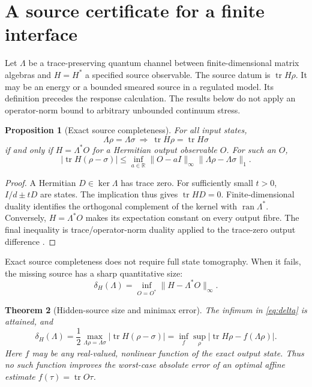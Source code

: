 \documentclass[12pt,a4paper]{article}
\newtheorem{theorem}{Theorem}[section]
\newtheorem{proposition}[theorem]{Proposition}
\theoremstyle{definition}
\newcommand{\tr}{\operatorname{tr}}
\newcommand{\ran}{\operatorname{ran}}
\begin{document}
\section{A source certificate for a finite interface}
\label{sec:source}

Let $\Lambda$ be a trace-preserving quantum channel between
finite-dimensional matrix algebras and $H=H^*$ a specified source
observable. The source datum is $\tr H\rho$. It may be an energy or a
bounded smeared source in a regulated model. Its definition precedes the
response calculation. The results below do not apply an operator-norm
bound to arbitrary unbounded continuum stress.

\begin{proposition}[Exact source completeness]
\label{prop:source-complete}
For all input states,
\begin{equation}
 \Lambda\rho=\Lambda\sigma\ \Longrightarrow\
 \tr H\rho=\tr H\sigma
\end{equation}
if and only if $H=\Lambda^*O$ for a Hermitian output observable $O$.
For such an $O$,
\begin{equation}
 |\tr H(\rho-\sigma)|
 \leq\inf_{a\in\mathbb R}\|O-aI\|_\infty
                  \|\Lambda\rho-\Lambda\sigma\|_1.
 \label{eq:source-stability}
\end{equation}
\end{proposition}
\begin{proof}
A Hermitian $D\in\ker\Lambda$ has trace zero. For sufficiently small
$t>0$, $I/d\pm tD$ are states. The implication thus gives $\tr HD=0$.
Finite-dimensional duality identifies the orthogonal complement of the
kernel with $\ran\Lambda^*$. Conversely, $H=\Lambda^*O$ makes its
expectation constant on every output fibre. The final inequality is
trace/operator-norm duality applied to the trace-zero output difference
\cite{Watrous2018}.
\end{proof}

Exact source completeness does not require full state tomography. When
it fails, the missing source has a sharp quantitative size:
\begin{equation}
 \delta_H(\Lambda)
 =\inf_{O=O^*}\|H-\Lambda^*O\|_\infty.
 \label{eq:delta}
\end{equation}

\begin{theorem}[Hidden-source size and minimax error]
\label{thm:minimax}
The infimum in \eqref{eq:delta} is attained, and
\begin{equation}
 \delta_H(\Lambda)
 =\frac12\max_{\Lambda\rho=\Lambda\sigma}
       |\tr H(\rho-\sigma)|
 =\inf_f\sup_\rho|\tr H\rho-f(\Lambda\rho)|.
 \label{eq:minimax}
\end{equation}
Here $f$ may be any real-valued, nonlinear function of the exact output
state. Thus no such function improves the worst-case absolute error of
an optimal affine estimate $f(\tau)=\tr O\tau$.
\end{theorem}
\end{document}
